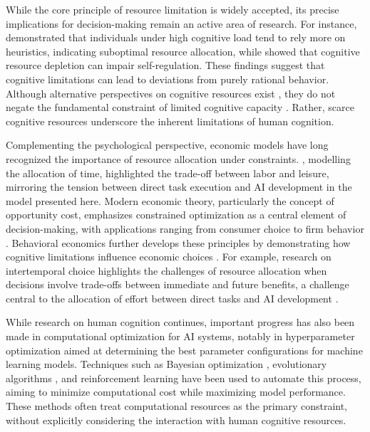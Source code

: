 \documentclass[11pt]{article}
\theoremstyle{definition}
\theoremstyle{remark}
\begin{document}
While the core principle of resource limitation is widely accepted, its precise implications for decision-making remain an active area of research. For instance, \cite{deck2015effect} demonstrated that individuals under high cognitive load tend to rely more on heuristics, indicating suboptimal resource allocation, while \cite{hagger2010ego} showed that cognitive resource depletion can impair self-regulation. These findings suggest that cognitive limitations can lead to deviations from purely rational behavior. Although alternative perspectives on cognitive resources exist \citep{tuk2015propagation,inzlicht2021integrating}, they do not negate the fundamental constraint of limited cognitive capacity \citep{palma2018self}. Rather, scarce cognitive resources underscore the inherent limitations of human cognition.

Complementing the psychological perspective, economic models have long recognized the importance of resource allocation under constraints. \cite{becker1965theory}, modelling the allocation of time, highlighted the trade-off between labor and leisure, mirroring the tension between direct task execution and AI development in the model presented here. Modern economic theory, particularly the concept of opportunity cost, emphasizes constrained optimization as a central element of decision-making, with applications ranging from consumer choice to firm behavior \citep{varian1992microeconomic}. Behavioral economics further develops these principles by demonstrating how cognitive limitations influence economic choices \citep{thaler2016behavioral}. For example, research on intertemporal choice highlights the challenges of resource allocation when decisions involve trade-offs between immediate and future benefits, a challenge central to the allocation of effort between direct tasks and AI development \citep{loewenstein1992anomalies,kim2019effect}.

While research on human cognition continues, important progress has also been made in computational optimization for AI systems, notably in hyperparameter optimization aimed at determining the best parameter configurations for machine learning models. Techniques such as Bayesian optimization \citep{snoek2012practical}, evolutionary algorithms \citep{real2019regularized}, and reinforcement learning \citep{elsken2019neural} have been used to automate this process, aiming to minimize computational cost while maximizing model performance. These methods often treat computational resources as the primary constraint, without explicitly considering the interaction with human cognitive resources.
\end{document}
